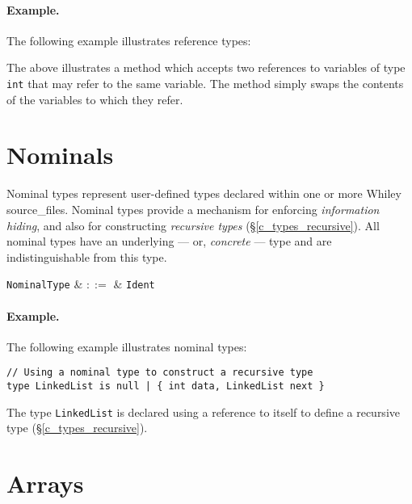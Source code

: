 \paragraph{Example.} The following example illustrates reference types:



The above illustrates a method which accepts two references to variables of type \lstinline{int} that may refer to the same variable.  The method simply swaps the contents of the variables to which they refer.


\section{Nominals}
\label{c_types_nominal}

Nominal types represent user-defined types declared within one or more Whiley \gls{source_file}s.  Nominal types provide a mechanism for enforcing {\em information hiding}, and also for constructing {\em recursive types} (\S\ref{c_types_recursive}).  All nominal types have an underlying --- or, {\em concrete} --- type and are indistinguishable from this type.   

\begin{syntax}
  \verb+NominalType+ & $::=$ & \verb+Ident+\\
\end{syntax}

\paragraph{Example.} The following example illustrates nominal types:
\begin{lstlisting}
// Using a nominal type to construct a recursive type
type LinkedList is null | { int data, LinkedList next }
\end{lstlisting}
The type \lstinline{LinkedList} is declared using a reference to itself to define a recursive type (\S\ref{c_types_recursive}).  


\section{Arrays}
\label{c_types_array}

